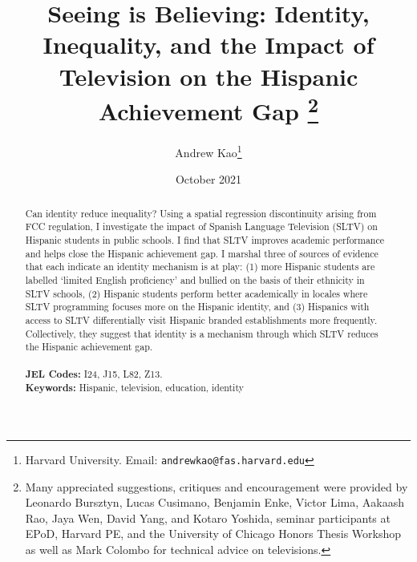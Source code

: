 \documentclass[11pt]{article}
\begin{document}
\title{\textbf{Seeing is Believing: Identity, Inequality, and the Impact of Television on the Hispanic Achievement Gap}%
\thanks{Many appreciated suggestions, critiques and encouragement were provided by Leonardo Bursztyn, Lucas Cusimano, Benjamin Enke, Victor Lima, Aakaash Rao, Jaya Wen, David Yang, and Kotaro Yoshida, seminar participants at EPoD, Harvard PE, and the University of Chicago Honors Thesis Workshop as well as Mark Colombo for technical advice on televisions. }\\
}



\author{Andrew Kao\thanks{Harvard University. Email: \texttt{andrewkao@fas.harvard.edu}} }

\date{October 2021}
{\vspace{-5ex}}


\maketitle

\begin{abstract}
\noindent  Can identity reduce inequality? Using a spatial regression discontinuity arising from FCC regulation, I investigate the impact of Spanish Language Television (SLTV) on Hispanic students in public schools. I find that SLTV improves academic performance and helps close the Hispanic achievement gap. I marshal three of sources of evidence that each indicate an identity mechanism is at play: (1) more Hispanic students are labelled `limited English proficiency' and bullied on the basis of their ethnicity in SLTV schools, (2) Hispanic students perform better academically in locales where SLTV programming focuses more on the Hispanic identity, and (3) Hispanics with access to SLTV differentially visit Hispanic branded establishments more frequently. Collectively, they suggest that identity is a mechanism through which SLTV reduces the Hispanic achievement gap.\\\\
\textbf{JEL Codes:} I24, J15, L82, Z13.\\
\textbf{Keywords:} Hispanic, television, education, identity
\end{abstract}




\newsavebox{\tablebox} \newlength{\tableboxwidth}

\setlength{\baselineskip}{22pt}
\end{document}
